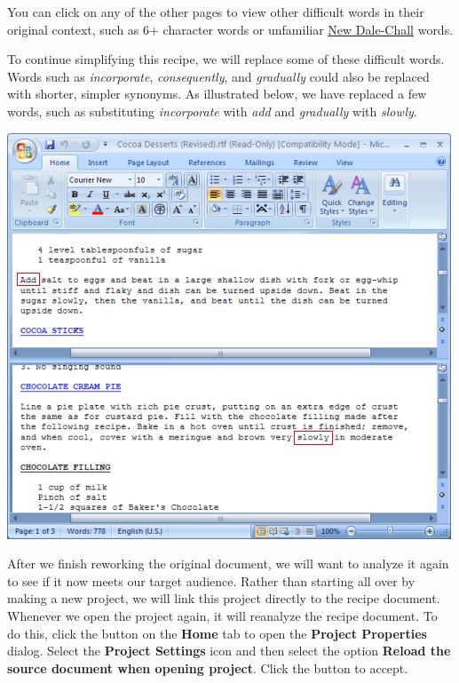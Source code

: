 \documentclass[
]{book}
\theoremstyle{definition}
\theoremstyle{definition}
\theoremstyle{definition}
\theoremstyle{definition}
\theoremstyle{remark}
\begin{document}
You can click on any of the other pages to view other difficult words in their original context, such as 6+ character words or unfamiliar \protect\hyperlink{dale-chall-test}{New Dale-Chall} words.

To continue simplifying this recipe, we will replace some of these difficult words. Words such as \emph{incorporate}, \emph{consequently}, and \emph{gradually} could also be replaced with shorter, simpler synonyms. As illustrated below, we have replaced a few words, such as substituting \emph{incorporate} with \emph{add} and \emph{gradually} with \emph{slowly}.

\includegraphics{Images/NonGenerated/improvedwords.png}

After we finish reworking the original document, we will want to analyze it again to see if it now meets our target audience. Rather than starting all over by making a new project, we will link this project directly to the recipe document. Whenever we open the project again, it will reanalyze the recipe document. To do this, click the  button on the \textbf{Home} tab to open the \textbf{Project Properties} dialog. Select the \textbf{Project Settings} icon and then select the option \textbf{Reload the source document when opening project}. Click the  button to accept.
\end{document}
